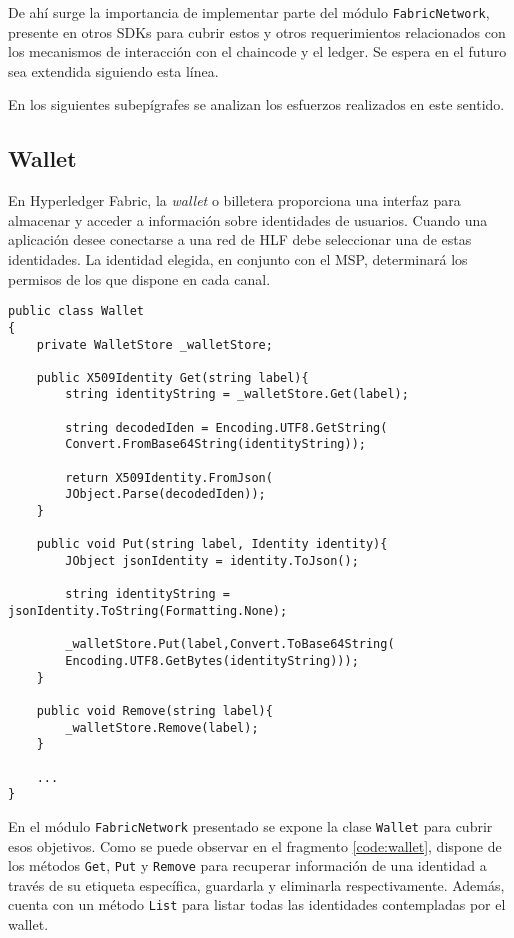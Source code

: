 De ah\'i surge la importancia de implementar parte del m\'odulo \texttt{FabricNetwork}, presente en otros SDKs para cubrir estos y otros requerimientos relacionados con los mecanismos de interacci\'on con el chaincode y el ledger. Se espera en el futuro sea extendida siguiendo esta l\'inea.

En los siguientes subep\'igrafes se analizan los esfuerzos realizados en este sentido.%

\subsection{Wallet}

En Hyperledger Fabric, la \emph{wallet} o billetera proporciona una interfaz para almacenar y acceder a información sobre identidades de usuarios. Cuando una aplicaci\'on desee conectarse a una red de HLF debe seleccionar una de estas identidades. La identidad elegida, en conjunto con el MSP, determinar\'a los permisos de los que dispone en cada canal. %

\begin{lstlisting}[caption={Elementos de la clase \texttt{Wallet}.}, label={code:wallet}]
public class Wallet
{
	private WalletStore _walletStore;

	public X509Identity Get(string label){
		string identityString = _walletStore.Get(label);
		
		string decodedIden = Encoding.UTF8.GetString(
		Convert.FromBase64String(identityString));
		
		return X509Identity.FromJson(
		JObject.Parse(decodedIden));
	}

	public void Put(string label, Identity identity){
		JObject jsonIdentity = identity.ToJson();
		
		string identityString = jsonIdentity.ToString(Formatting.None);
		
		_walletStore.Put(label,Convert.ToBase64String(
		Encoding.UTF8.GetBytes(identityString)));
	}

	public void Remove(string label){
		_walletStore.Remove(label);
	}
	
	...
}
\end{lstlisting}

En el m\'odulo \texttt{FabricNetwork} presentado se expone la clase \texttt{Wallet} para cubrir esos objetivos. Como se puede observar en el fragmento \ref{code:wallet}, dispone de los m\'etodos \texttt{Get}, \texttt{Put} y \texttt{Remove} para recuperar informaci\'on de una identidad a trav\'es de su etiqueta espec\'ifica, guardarla y eliminarla respectivamente. Adem\'as, cuenta con un m\'etodo \texttt{List} para listar todas las identidades contempladas por el wallet. 

